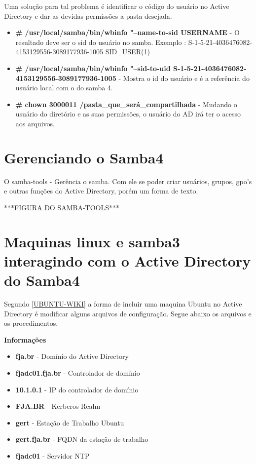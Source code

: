Uma solução para tal problema é identificar o código do usuário no Active Directory e dar as devidas permissões a pasta desejada.

\begin{itemize}
	\item \textbf{\# /usr/local/samba/bin/wbinfo "--name-to-sid USERNAME} - O resultado deve ser o sid do usuário no samba. Exemplo : S-1-5-21-4036476082-4153129556-3089177936-1005 SID\_USER(1)
	\item \textbf{\# /usr/local/samba/bin/wbinfo "--sid-to-uid S-1-5-21-4036476082-4153129556-3089177936-1005} - Mostra o id do usuário e é a referência do usuário local com o do samba 4.
	\item \textbf{\# chown 3000011 /pasta\_que\_será\_compartilhada} - Mudando o usuário do diretório e as suas permissões, o usuário do AD irá ter o acesso aos arquivos.
\end{itemize} 

\section{Gerenciando o Samba4}

O samba-tools - Gerência o samba. Com ele se poder criar usuários, grupos, gpo's e outras funções do Active Directory, porém um forma de texto.

***FIGURA DO SAMBA-TOOLS***

\section{Maquinas linux e samba3 interagindo com o Active Directory do  Samba4}

Segundo \cite{UBUNTU-WIKI} \ref{UBUNTU-WIKI} a forma de incluir uma maquina Ubuntu no Active Directory é modificar alguns arquivos de configuração.
Segue abaixo os arquivos e os procedimentos.

\textbf{Informações}

\begin{itemize}
	\item \textbf{fja.br} -  Domínio do Active Directory
	\item \textbf{fjadc01.fja.br} - Controlador de domínio
	\item \textbf{10.1.0.1} - IP do controlador de domínio
	\item \textbf{FJA.BR} - Kerberos Realm
	\item \textbf{gert} - Estação de Trabalho Ubuntu
	\item \textbf{gert.fja.br} - FQDN da estação de trabalho
	\item \textbf{fjadc01} - Servidor NTP
\end{itemize}

